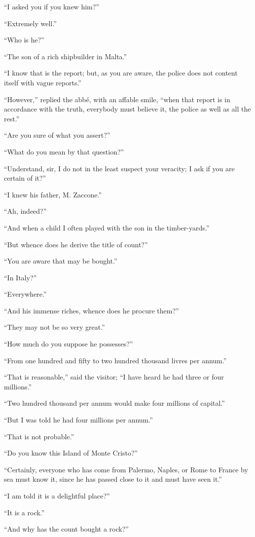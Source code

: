 “I asked you if you knew him?”

“Extremely well.”

“Who is he?”

“The son of a rich shipbuilder in Malta.”

“I know that is the report; but, as you are aware, the police does not
content itself with vague reports.”

“However,” replied the abbé, with an affable smile, “when that report
is in accordance with the truth, everybody must believe it, the police
as well as all the rest.”

“Are you sure of what you assert?”

“What do you mean by that question?”

“Understand, sir, I do not in the least suspect your veracity; I ask if
you are certain of it?”

“I knew his father, M. Zaccone.”

“Ah, indeed?”

“And when a child I often played with the son in the timber-yards.”

“But whence does he derive the title of count?”

“You are aware that may be bought.”

“In Italy?”

“Everywhere.”

“And his immense riches, whence does he procure them?”

“They may not be so very great.”

“How much do you suppose he possesses?”

“From one hundred and fifty to two hundred thousand livres per annum.”

“That is reasonable,” said the visitor; “I have heard he had three or
four millions.”

“Two hundred thousand per annum would make four millions of capital.”

“But I was told he had four millions per annum.”

“That is not probable.”

“Do you know this Island of Monte Cristo?”

“Certainly, everyone who has come from Palermo, Naples, or Rome to
France by sea must know it, since he has passed close to it and must
have seen it.”

“I am told it is a delightful place?”

“It is a rock.”

“And why has the count bought a rock?”

